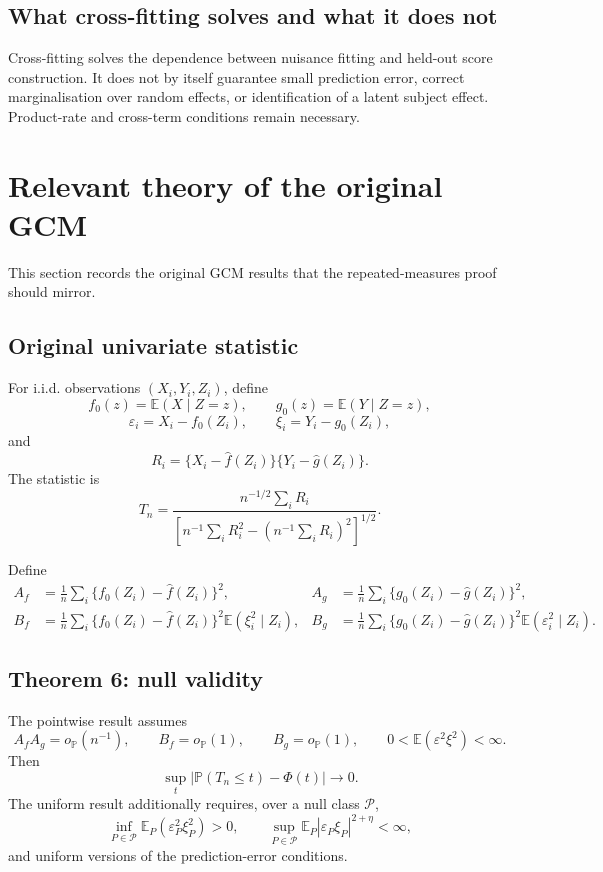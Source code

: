 \documentclass[11pt]{article}
\theoremstyle{definition}
\newcommand{\E}{\mathbb{E}}
\newcommand{\Pp}{\mathbb{P}}
\newcommand{\op}{o_{\mathbb{P}}}
\begin{document}
\subsection{What cross-fitting solves and what it does not}

Cross-fitting solves the dependence between nuisance fitting and held-out score construction.
It does not by itself guarantee small prediction error, correct marginalisation over random
effects, or identification of a latent subject effect. Product-rate and cross-term conditions
remain necessary.

\section{Relevant theory of the original GCM}

This section records the original GCM results that the repeated-measures proof should mirror.

\subsection{Original univariate statistic}

For i.i.d. observations $(X_i,Y_i,Z_i)$, define
\[
f_0(z)=\E(X\mid Z=z),
\qquad
g_0(z)=\E(Y\mid Z=z),
\]
\[
\varepsilon_i=X_i-f_0(Z_i),
\qquad
\xi_i=Y_i-g_0(Z_i),
\]
and
\[
R_i=\{X_i-\widehat f(Z_i)\}\{Y_i-\widehat g(Z_i)\}.
\]
The statistic is
\[
T_n
=
\frac{n^{-1/2}\sum_iR_i}
{\left[n^{-1}\sum_iR_i^2-(n^{-1}\sum_iR_i)^2\right]^{1/2}}.
\]

Define
\begin{align*}
A_f&=\frac1n\sum_i\{f_0(Z_i)-\widehat f(Z_i)\}^2,
&
A_g&=\frac1n\sum_i\{g_0(Z_i)-\widehat g(Z_i)\}^2,\\
B_f&=\frac1n\sum_i\{f_0(Z_i)-\widehat f(Z_i)\}^2
\E(\xi_i^2\mid Z_i),
&
B_g&=\frac1n\sum_i\{g_0(Z_i)-\widehat g(Z_i)\}^2
\E(\varepsilon_i^2\mid Z_i).
\end{align*}

\subsection{Theorem 6: null validity}

The pointwise result assumes
\[
A_fA_g=\op(n^{-1}),
\qquad
B_f=\op(1),
\qquad
B_g=\op(1),
\qquad
0<\E(\varepsilon^2\xi^2)<\infty.
\]
Then
\[
\sup_t|\Pp(T_n\leq t)-\Phi(t)|\to0.
\]
The uniform result additionally requires, over a null class $\mathcal P$,
\[
\inf_{P\in\mathcal P}\E_P(\varepsilon_P^2\xi_P^2)>0,
\qquad
\sup_{P\in\mathcal P}\E_P|\varepsilon_P\xi_P|^{2+\eta}<\infty,
\]
and uniform versions of the prediction-error conditions.
\end{document}
